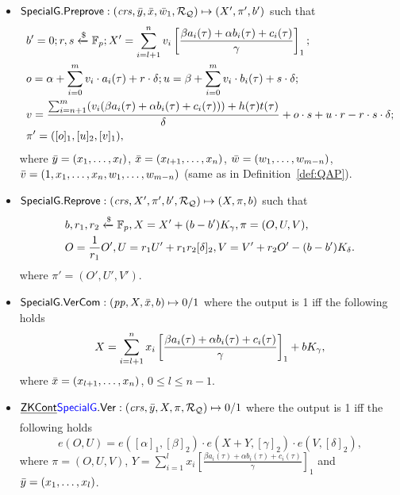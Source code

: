 \begin{definition}
\begin{itemize}
\item ${\mathsf{SpecialG}}.{\mathsf{Preprove}}: (\mathit{crs}, \bar{y}, \bar{x}, \bar{w}_1, \mathcal{R}_{\mathcal{Q}}) \mapsto (X', \pi', b')$ such that \\
\begin{align*}
&b' = 0; r, s\xleftarrow{\$} \mathbb{F}_p; X' = \sum_{i=l+1}^{n} v_i\left[ \frac{\beta a_i(\tau)+ \alpha b_i(\tau)+ c_i(\tau)}{\gamma} \right]_1;  \\
&o = \alpha + \sum_{i=0}^{m} v_i \cdot a_i(\tau) + r \cdot \delta; u = \beta + \sum_{i=0}^{m} v_i \cdot b_i(\tau) + s \cdot \delta; \\ 
&v = \frac{\sum_{i=n+1}^{m} (v_i (\beta a_i(\tau)+ \alpha b_i(\tau)+ c_i(\tau))) + h(\tau)t(\tau)}{\delta}   + o\cdot s + u \cdot r - r \cdot s \cdot \delta; \\
& \pi' = ([o]_1, [u]_2, [v]_1), 
\end{align*}
where $\bar{y} = (x_1, \ldots, x_l)$, $\bar{x} = (x_{l+1}, \ldots, x_n)$, $\bar{w} = (w_1, \ldots, w_{m-n})$, \\
$\bar{v} = (1, x_1, \ldots, x_n, w_1, \ldots, w_{m-n})$ (same as in Definition~\ref{def:QAP}).


\item ${\mathsf{SpecialG}}.{\mathsf{Reprove}}: (\mathit{crs}, X', \pi', b', \mathcal{R}_{\mathcal{Q}}) \mapsto (X, \pi, b)$  such that
\begin{align*}
&b , r_1, r_2  \xleftarrow{\$} \mathbb{F}_p, X = X' + (b- b') K_{\gamma}, \pi = (O, U, V), \\
&O = \frac{1}{r_1} O', U = r_1 U' + r_1r_2[\delta]_2, V = V' + r_2O'  - (b - b') K_{\delta} .
\end{align*}
\noindent where $\pi' = (O', U', V')$.
 
\item ${\mathsf{SpecialG}}.{\mathsf{VerCom}}: (\mathit{pp}, X, \bar{x}, b) \mapsto 0/1$ where the output is 1 iff the following holds
$$X = \sum_{i=l+1}^{n} x_i\left[ \frac{\beta a_i(\tau)+ \alpha b_i(\tau)+ c_i(\tau)}{\gamma} \right]_1  + b K_{\gamma},$$
where $\bar{x} = (x_{l+1}, \ldots, x_n)$, $ 0 \leq l \leq n-1$. 

\item $\handan{\ZKCont}{\SpecialG}.\Verify: (\crs, \bar{y}, X, \pi, \relRQ) \mapsto 0/1$ where the output is 1 iff the following holds 
$$e(O,U) = e([\alpha]_1, [\beta]_2) \cdot e(X + Y, [\gamma]_2) \cdot e(V, [\delta]_2),$$
where $\pi = (O, U, V)$, $Y = \sum_{i=1}^{l} x_i\left[ \frac{\beta a_i(\tau)+ \alpha b_i(\tau)+ c_i(\tau)}{\gamma} \right]_1$ 
and $\bar{y} = (x_1, \ldots, x_l)$.


\end{itemize}
\end{definition}
